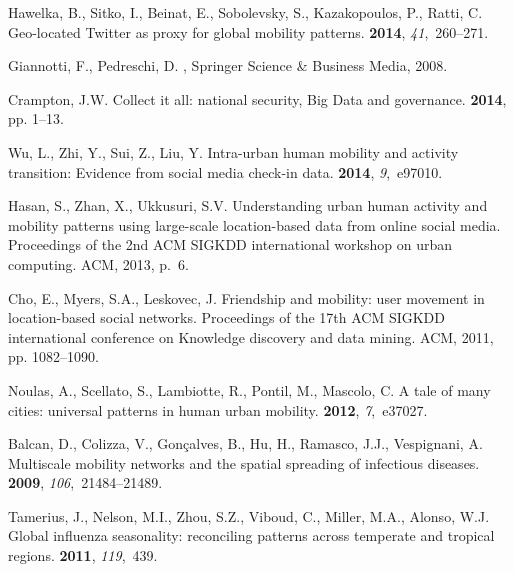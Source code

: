 \documentclass{elsart}
\begin{document}
\begin{thebibliography}{00}
Hawelka, B., Sitko, I., Beinat, E., Sobolevsky, S., Kazakopoulos, P., Ratti, C.
\newblock Geo-located Twitter as proxy for global mobility patterns.
 {\bf 2014}, {\em
  41},~260--271.

Giannotti, F., Pedreschi, D.
, Springer Science \& Business Media,  2008.

Crampton, J.W.
\newblock Collect it all: national security, Big Data and governance.
 {\bf 2014}, pp. 1--13.

Wu, L., Zhi, Y., Sui, Z., Liu, Y.
\newblock Intra-urban human mobility and activity transition: Evidence from
  social media check-in data.
 {\bf 2014}, {\em 9},~e97010.

Hasan, S., Zhan, X., Ukkusuri, S.V.
\newblock Understanding urban human activity and mobility patterns using
  large-scale location-based data from online social media.
\newblock  Proceedings of the 2nd ACM SIGKDD international workshop on urban
  computing. ACM,  2013, p.~6.

Cho, E., Myers, S.A., Leskovec, J.
\newblock Friendship and mobility: user movement in location-based social
  networks.
\newblock  Proceedings of the 17th ACM SIGKDD international conference on
  Knowledge discovery and data mining. ACM,  2011, pp. 1082--1090.

Noulas, A., Scellato, S., Lambiotte, R., Pontil, M., Mascolo, C.
\newblock A tale of many cities: universal patterns in human urban mobility.
 {\bf 2012}, {\em 7},~e37027.

Balcan, D., Colizza, V., Gon{\c{c}}alves, B., Hu, H., Ramasco, J.J.,
  Vespignani, A.
\newblock Multiscale mobility networks and the spatial spreading of infectious
  diseases.
 {\bf 2009},
  {\em 106},~21484--21489.

Tamerius, J., Nelson, M.I., Zhou, S.Z., Viboud, C., Miller, M.A., Alonso, W.J.
\newblock Global influenza seasonality: reconciling patterns across temperate
  and tropical regions.
 {\bf 2011}, {\em 119},~439.


\end{thebibliography}
\end{document}
